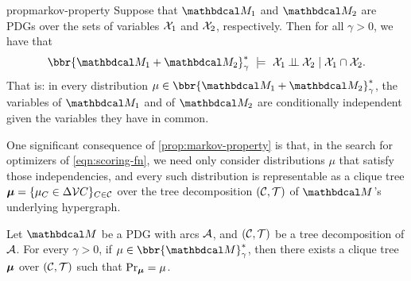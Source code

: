 \documentclass[twoside]{article}
\begin{document}
\begin{linked}{prop}{markov-property}
    Suppose that $\dg M_1$ and $\dg M_2$ are PDGs
    over the sets of variables $\mathcal X_1$ and $\mathcal X_2$, respectively.
	Then for all $\gamma > 0$, we have that
	\[
	 	\bbr{\dg M_1 \bundle \dg M_2}^*_\gamma
			~\models~
		\X_1 \mathbin{\bot\!\!\!\bot} \X_2 \mid \X_1 \cap \X_2.
	\]
	That is: in every distribution $\mu \in \bbr{\dg M_1 \bundle \dg M_2}^*_\gamma$,
    the variables of $\dg M_1$ and of $\dg M_2$ are conditionally independent given the variables they have in common.
\end{linked}

One significant consequence of \cref{prop:markov-property} is that, in the
search for optimizers of \eqref{eqn:scoring-fn}, we 
need only
consider distributions $\mu$ that satisfy those independencies,
and every such distribution is representable as a clique tree
$\boldsymbol\mu = \{\mu_C \in \Delta\mathcal V C \}_{C \in \mathcal C}$
over the tree decomposition $(\cal C, T)$ 
of $\dg M$'s underlying hypergraph.

\begin{coro}
    Let $\dg M$ be a PDG with arcs $\mathcal A$, and
    $(\cal C, T)$ be a tree decomposition of $\mathcal A$.
    For every $\gamma > 0$, if
    $\mu \in \bbr{\dg M}^*_\gamma$, then there exists a clique tree
    $\boldsymbol\mu$ over $(\cal C, T)$ such that $\Pr_{\boldsymbol\mu} = \mu$. 
\end{coro}
\end{document}
